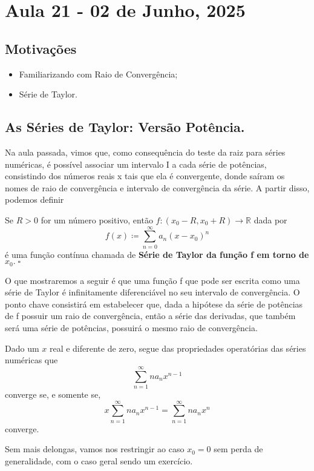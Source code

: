\documentclass[../analysisII_notes.tex]{subfiles}
\begin{document}
\section{Aula 21 - 02 de Junho, 2025}
\subsection{Motivações}
\begin{itemize}
	\item Familiarizando com Raio de Convergência;
	\item Série de Taylor.
\end{itemize}
\subsection{As Séries de Taylor: Versão Potência.}
Na aula passada, vimos que, como consequência do teste da raiz para séries numéricas, é possível associar um intervalo I a cada série de potências, consistindo dos números reais x tais que ela é convergente, donde saíram os nomes de raio de convergência e intervalo de convergência da série. A partir disso, podemos definir
\begin{def*}
	Se \(R > 0\) for um número positivo, então \(f:(x_{0}-R, x_{0}+R)\rightarrow \mathbb{R}\) dada por
	\[
		f(x)\coloneqq \sum\limits_{n=0}^{\infty}a_{n}(x-x_{0})^{n}
	\]
	é uma função contínua chamada de \textbf{Série de Taylor da função f em torno de }\(x_{0}.\; \square\)
\end{def*}
O que mostraremos a seguir é que uma função f que pode ser escrita como uma série de Taylor é infinitamente diferenciável no seu intervalo de convergência. O ponto chave consistirá em estabelecer que, dada a hipótese da série de potências de f possuir um raio de convergência, então a série das derivadas, que também será uma série de potências, possuirá o mesmo raio de convergência.
\begin{tcolorbox}[
		skin=enhanced,
		title=Observação,
		fonttitle=\bfseries,
		colframe=black,
		colbacktitle=cyan!75!white,
		colback=cyan!15,
		colbacklower=black,
		coltitle=black,
		drop fuzzy shadow,
	]
	Dado um \(x\) real e diferente de zero, segue das propriedades operatórias das séries numéricas que
	\[
		\sum\limits_{n=1}^{\infty}na_{n}x^{n-1}
	\]
	converge se, e somente se,
	\[
		x \sum\limits_{n=1}^{\infty}na_{n}x^{n-1} = \sum\limits_{n=1}^{\infty}na_{n}x^{n}
	\]
	converge.
\end{tcolorbox}
Sem mais delongas, vamos nos restringir ao caso \(x_{0} = 0\) sem perda de generalidade, com o caso geral sendo um exercício.
\end{document}
